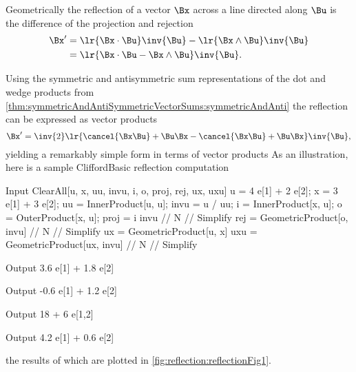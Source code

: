 %
%
Geometrically the reflection of a vector \( \Bx \) across a line directed along \( \Bu \) is the difference of the projection and rejection
\begin{equation}\label{eqn:reflection:900}
\begin{aligned}
\Bx'
&= \lr{ \Bx \cdot \Bu } \inv{\Bu} - \lr{ \Bx \wedge \Bu } \inv{\Bu } \\
&= \lr{ \Bx \cdot \Bu - \Bx \wedge \Bu } \inv{\Bu }.
\end{aligned}
\end{equation}

Using the symmetric and antisymmetric sum representations of the dot and wedge products from
\cref{thm:symmetricAndAntiSymmetricVectorSums:symmetricAndAnti}
the reflection can be expressed as vector products
\begin{equation}\label{eqn:reflection:940}
\Bx'
= \inv{2} \lr{ \cancel{\Bx \Bu} + \Bu \Bx - \cancel{\Bx \Bu} + \Bu \Bx } \inv{\Bu },
\end{equation}
yielding a remarkably simple form in terms of vector products
As an illustration, here is a sample CliffordBasic reflection computation
\begin{mmaCell}[moredefined={u, x, uu, invu, i, o, proj, rej, ux, uxu, e, InnerProduct, OuterProduct, GeometricProduct}]{Input}
  ClearAll[u, x, uu, invu, i, o, proj, rej, ux, uxu]
  u = 4 e[1] + 2 e[2];
  x = 3 e[1] + 3 e[2];
  uu = InnerProduct[u, u];
  invu = u / uu;
  i = InnerProduct[x, u];
  o = OuterProduct[x, u];
  proj = i invu // N // Simplify
  rej = GeometricProduct[o, invu] // N // Simplify
  ux = GeometricProduct[u, x]
  uxu = GeometricProduct[ux, invu] // N // Simplify
\end{mmaCell}
\begin{mmaCell}{Output}
  3.6 e[1] + 1.8 e[2]
\end{mmaCell}
\begin{mmaCell}{Output}
  -0.6 e[1] + 1.2 e[2]
\end{mmaCell}
\begin{mmaCell}{Output}
  18 + 6 e[1,2]
\end{mmaCell}
\begin{mmaCell}{Output}
  4.2 e[1] + 0.6 e[2]
\end{mmaCell}
the results of which are plotted in \cref{fig:reflection:reflectionFig1}.

